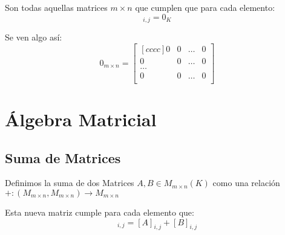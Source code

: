 \documentclass[12pt]{report}                                    %
\begin{document}
                Son todas aquellas matrices $m \times n$ que cumplen que para cada elemento:
                \begin{equation}
                    [0]_{i,j} = 0_K
                \end{equation}

                Se ven algo así:
                \begin{equation*}
                    0_{m \times n} =
                    \begin{bmatrix}[cccc]
                        0 & 0 & \dots & 0   \\
                        0 & 0 & \dots & 0   \\
                        \dots               \\
                        0 & 0 & \dots & 0   \\
                    \end{bmatrix}
                \end{equation*}












    \clearpage
    \chapter{Álgebra Matricial}

        \clearpage
        \section{Suma de Matrices}

            Definimos la suma de dos Matrices $A, B \in M_{m \times n}(K)$ como una relación\\
            $+: (M_{m \times n}, M_{m \times n}) \to M_{m \times n}$

            Esta nueva matriz cumple para cada elemento que:
            \begin{equation}
                [A+B]_{i, j} = [A]_{i,j} + [B]_{i,j}
            \end{equation}
\end{document}
